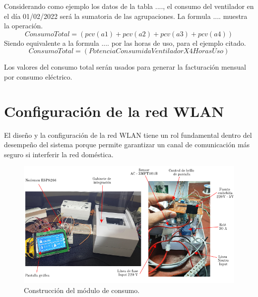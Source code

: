 \begin{enumerate}
\begin{table}[h]
\begin{tabular}{l c c c}
		\bottomrule
		\hline
	\end{tabular}
	\label{tab:tablaconsumos}
\end{table}

Considerando como ejemplo los datos de la tabla ...., el consumo del ventilador en el día 01/02/2022 será la sumatoria de las agrupaciones. La formula .... muestra la operación.
\begin{equation}
	\label{eq:potenciaformejemplo}
	Consumo Total = \left( pcv(a1) + pcv(a2)+ pcv(a3)+ pcv(a4) \right)
\end{equation}
Siendo equivalente a la formula .... por las horas de uso, para el ejemplo citado.
\begin{equation}
	\label{eq:potenciaformejemplo2}
	Consumo Total = \left(Potencia Consumida Ventilador X 4 Horas Uso \right)
\end{equation}

Los valores del consumo total serán usados para generar la facturación mensual por consumo eléctrico. 


\end{enumerate}



\section{Configuración de la red WLAN}

El diseño y la configuración de la red WLAN tiene un rol fundamental dentro del desempeño del sistema porque permite garantizar un canal de comunicación más seguro si interferir la red doméstica.

\begin{landscape} %
\begin{figure}[htpb]
\centering 
\includegraphics[width=1.5\textwidth]{./Figures/moduloconsumo.png}
\caption{Construcción del módulo de consumo.}
\label{fig:modconsumo}
\end{figure}
\end{landscape} %


